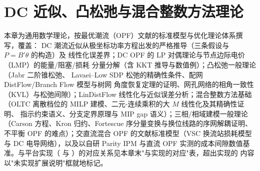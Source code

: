 
\section{DC 近似、凸松弛与混合整数方法理论}\label{sec:opf-th-dc}

\begin{theorynote}
本章为通用数学理论，按最优潮流（OPF）文献的标准模型与优化理论体系撰写，覆盖：
DC 潮流近似从极坐标功率方程出发的严格推导（三条假设与 $P=B'\theta$ 的构造）及
线性化误差界；DC OPF 的 LP 对偶理论与节点边际电价（LMP）的能量/阻塞/损耗
分量分解（含 KKT 推导与数值例）；凸松弛一般理论（Jabr 二阶锥松弛、
Lavaei--Low SDP 松弛的精确性条件、配网 DistFlow/Branch Flow 模型与树网
角度恢复定理的证明、网孔网络的相角一致性（KVL）与松弛间隙）；LinDistFlow 线性化与近似误差分析；混合整数方法基础
（OLTC 离散档位的 MILP 建模、二元-连续乘积的大 $M$ 线性化及其精确性证明、
指示约束语义、分支定界原理与 MIP gap 语义）；三相/相域建模一般理论
（Carson 方程、Kron 归约、Fortescue 序分量变换与换位线路的序网解耦证明、
不平衡 OPF 的难点）；交直流混合 OPF 的文献标准模型（VSC 换流站损耗模型与
DC 电导网络），以及以自研 Parity IPM 与直流 OPF 实测的成本间隙数值基准。与平台实现（ 与
）的对应关系见本章末"与实现的对应"表，超出实现的
内容以"未实现扩展说明"框就地标记。
\end{theorynote}

